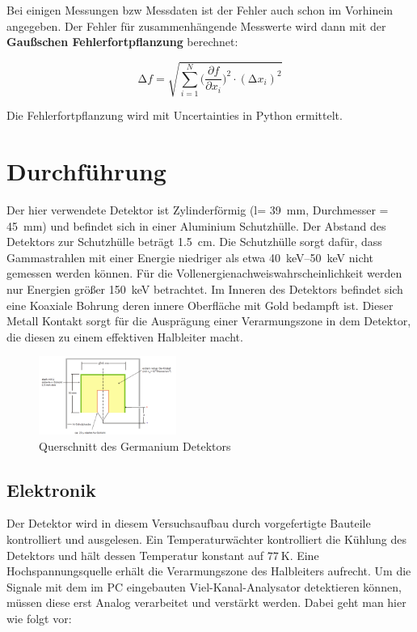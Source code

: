 Bei einigen Messungen bzw Messdaten ist der Fehler auch schon im Vorhinein
angegeben. Der Fehler für zusammenhängende Messwerte wird dann mit der
\textbf{Gaußschen Fehlerfortpflanzung} berechnet:

\begin{equation}
	\increment{f} = \sqrt{ \sum_{i = 1}^{N}  \biggl(\frac{\partial{f}}{\partial{x_i}}\biggr)^2\cdot(\increment{x_i})^2}
	\label{eqn:Gauss}
\end{equation}

Die Fehlerfortpflanzung wird mit Uncertainties in Python \cite{uncertainties}
ermittelt.


\section{Durchführung \cite[vgl.][]{man:v18}}

Der hier verwendete Detektor ist Zylinderförmig (l= \qty{39}{\mm}, Durchmesser
= \qty{45}{\mm}) und befindet sich in einer Aluminium Schutzhülle. Der Abstand
des Detektors zur Schutzhülle beträgt \qty{1.5}{\cm}. Die Schutzhülle sorgt
dafür, dass Gammastrahlen mit einer Energie niedriger als etwa
\qtyrange{40}{50}{\keV} nicht gemessen werden können. Für die
Vollenergienachweiswahrscheinlichkeit werden nur Energien größer
\qty{150}{\keV} betrachtet. Im Inneren des Detektors befindet sich eine
Koaxiale Bohrung deren innere Oberfläche mit Gold bedampft ist. Dieser Metall
Kontakt sorgt für die Ausprägung einer Verarmungszone in dem Detektor, die
diesen zu einem effektiven Halbleiter macht.

\begin{figure}
	\centering
	\includegraphics[width=0.4\textwidth]{./Bilder/querschnitt_detektor.png}
	\caption{Querschnitt des Germanium Detektors}\label{fig:cross}
\end{figure}


\subsection{Elektronik \cite[][Kap.17]{book:kolano}}
Der Detektor wird in diesem Versuchsaufbau durch vorgefertigte Bauteile
kontrolliert und ausgelesen. Ein Temperaturwächter kontrolliert die Kühlung des
Detektors und hält dessen Temperatur konstant auf $\qty{77}{\kelvin}$. Eine
Hochspannungsquelle erhält die Verarmungszone des Halbleiters aufrecht.
Um die Signale mit dem im PC eingebauten Viel-Kanal-Analysator detektieren können, 
müssen diese erst Analog verarbeitet und verstärkt werden. 
Dabei geht man hier wie folgt vor:

